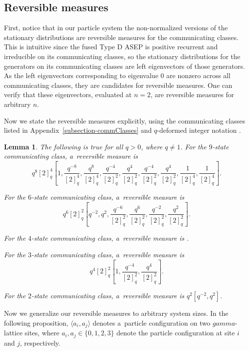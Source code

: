 \documentclass[10pt,a4paper]{amsart}
\numberwithin{equation}{section}
\newtheorem{Lemma}[Theorem]{Lemma}
\theoremstyle{definition}
\def\gamma{gamma}
\begin{document}
\subsection{Reversible measures} \label{subsection--StationaryDistr}

First, notice that in our particle system the non-normalized versions of the stationary distributions are reversible measures for the communicating classes. This is intuitive since the fused Type D ASEP is positive recurrent and irreducible on its communicating classes, so the stationary distributions for the generators on its communicating classes are left eigenvectors of those generators. As the left eigenvectors corresponding to eigenvalue 0 are nonzero across all communicating classes, they are candidates for reversible measures. One can verify that these eigenvectors, evaluated at $n=2$, are reversible measures for arbitrary $n$.

Now we state the reversible measures explicitly, using the communicating classes listed in Appendix~\ref{subsection-commClasses} and $q$-deformed integer notation .

\begin{Lemma}\label{allStationary} The following is true for all $q > 0$, where $q \neq 1$.
For the $9$-state communicating class, a~reversible measure is
\[q^8 [2]^4_q \left[1, \frac{q^{-8}}{[2]^4_q}, \frac{q^{8}}{[2]^4_q}, \frac{q^{-4}}{[2]^2_q}, \frac{q^{4}}{[2]^2_q}, \frac{q^{-4}}{[2]^2_q}, \frac{q^{4}}{[2]^2_q}, \frac{1}{[2]^4_q}, \frac{1}{[2]^4_q}\right].\]

For the $6$-state communicating class, a~reversible measure is
\[q^6 [2]^2_q \left[q^{-2}, q^2, \frac{q^{-6}}{[2]^2_q},\frac{q^{6}}{[2]^2_q}, \frac{q^{-2}}{[2]^2_q},\frac{q^{2}}{[2]^2_q} \right].\]

For the $4$-state communicating class, a~reversible measure is .

For the $3$-state communicating class, a~reversible measure is
\[q^4 [2]^2_q \left[1, \frac{q^{-4}}{[2]^2_q},\frac{q^{4}}{[2]^2_q} \right].\]

For the $2$-state communicating class, a~reversible measure is $q^2 \left[q^{-2}, q^2\right]$.
\end{Lemma}

Now we generalize our reversible measures to arbitrary system sizes. In the following proposition, $\langle a_i, a_j\rangle$ denotes a~particle configuration on two $\gamma$-lattice sites, where $a_i, a_j \in \{0,1,2,3\}$ denote the particle configuration at site $i$ and $j$, respectively.
\end{document}
